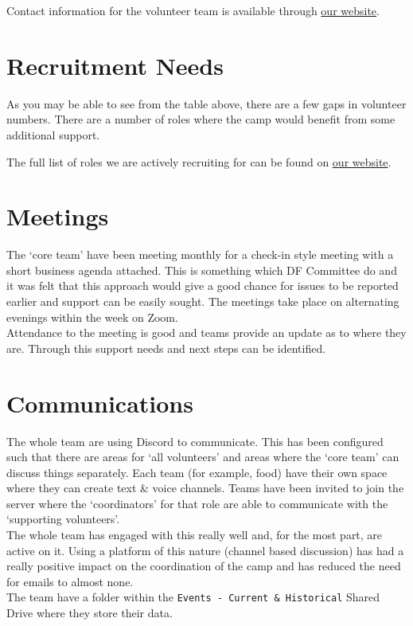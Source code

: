 Contact information for the volunteer team is available through \href{https://venturercamp.org.uk/contact/}{our website}.

\section{Recruitment Needs}
As you may be able to see from the table above, there are a few gaps in volunteer numbers. There are a number of roles where the camp would benefit from some additional support. 

The full list of roles we are actively recruiting for can be found on \href{https://venturercamp.org.uk/get-involved/}{our website}.

\section{Meetings}
The `core team' have been meeting monthly for a check-in style meeting with a short business agenda attached. This is something which DF Committee do and it was felt that this approach would give a good chance for issues to be reported earlier and support can be easily sought. The meetings take place on alternating evenings within the week on Zoom.\\

Attendance to the meeting is good and teams provide an update as to where they are. Through this support needs and next steps can be identified.

\section{Communications}
The whole team are using Discord to communicate. This has been configured such that there are areas for `all volunteers' and areas where the `core team' can discuss things separately. Each team (for example, food) have their own space where they can create text \& voice channels. Teams have been invited to join the server where the `coordinators' for that role are able to communicate with the `supporting volunteers'. \\

The whole team has engaged with this really well and, for the most part, are active on it. Using a platform of this nature (channel based discussion) has had a really positive impact on the coordination of the camp and has reduced the need for emails to almost none.\\

The team have a folder within the \texttt{Events - Current \& Historical} Shared Drive where they store their data.\\